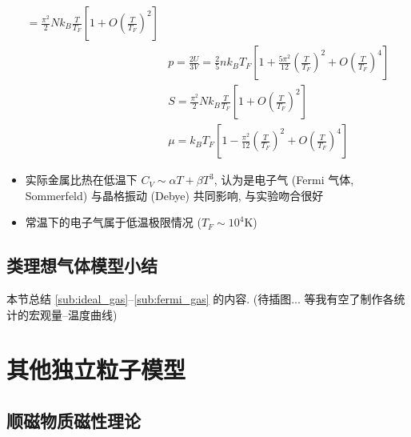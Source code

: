 \documentclass[12pt,a4paper]{article}%
\numberwithin{equation}{section}
\begin{document}
\begin{enumerate}
\begin{align}
        = \frac{\pi^2}2 Nk_B \frac{T}{T_F}\left[1+O\left(\frac{T}{T_F}\right)^2\right]\\
        &p = \frac{2U}{3V} = \frac 25nk_BT_F\left[1+\frac{5\pi^2}{12}\left(\frac{T}{T_F}\right)^2 + O\left(\frac{T}{T_F}\right)^4 \right] \\
        &S = \frac{\pi^2}2 Nk_B\frac{T}{T_F}\left[1+O\left(\frac{T}{T_F}\right)^2\right] \\
        &\mu = k_BT_F\left[1-\frac{\pi^2}{12}\left(\frac{T}{T_F}\right)^2 + O\left(\frac{T}{T_F}\right)^4 \right] 
    \end{align}
    \begin{itemize}
        \item 实际金属比热在低温下 $C_V\sim \alpha T + \beta T^3$, 认为是电子气 (Fermi 气体, Sommerfeld) 与晶格振动 (Debye) 共同影响, 与实验吻合很好
        \item 常温下的电子气属于低温极限情况 ($T_F\sim 10^4$K)
    \end{itemize}
\end{enumerate}
\subsection{类理想气体模型小结} %
\label{sub:sum_ideal_gas_like}%
本节总结 \ref{sub:ideal_gas}--\ref{sub:fermi_gas} 的内容.
(待插图... 等我有空了制作各统计的宏观量--温度曲线)

\section{其他独立粒子模型} %
\label{sec:model_independent}
\subsection{顺磁物质磁性理论}
\label{sub:paramagnetic}
\end{document}
